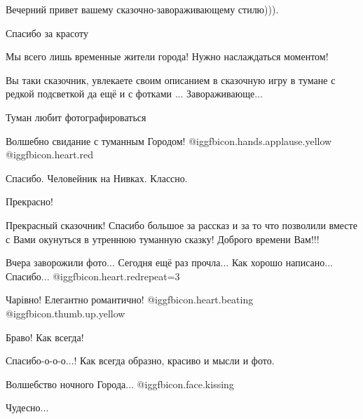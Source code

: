  
 
 
 
 
\zzSecCmt

\begin{itemize} %
Вечерний привет вашему сказочно-завораживающему стилю))).

Спасибо за красоту

Мы всего лишь временные жители города! Нужно наслаждаться моментом!


Вы таки сказочник, увлекаете своим описанием в сказочную игру в тумане с редкой
подсветкой да ещё и с фотками ... Завораживающе...

Туман любит фотографироваться


Волшебно свидание с туманным Городом! @igg{fbicon.hands.applause.yellow} @igg{fbicon.heart.red}

Спасибо. Человейник на Нивках. Классно.

Прекрасно!


Прекрасный сказочник! Спасибо большое за рассказ и за то что позволили вместе с
Вами окунуться в утреннюю туманную сказку! Доброго времени Вам!!!

Вчера заворожили фото...
Сегодня ещё раз прочла...
Как хорошо написано...
Спасибо...
@igg{fbicon.heart.red}{repeat=3}

Чарівно! Елегантно романтично!  @igg{fbicon.heart.beating}  @igg{fbicon.thumb.up.yellow} 

Браво! Как всегда!

Спасибо-о-о-о...!
Как всегда образно, красиво и мысли и фото.

Волшебство ночного Города... @igg{fbicon.face.kissing} 

Чудесно...

\end{itemize} %
